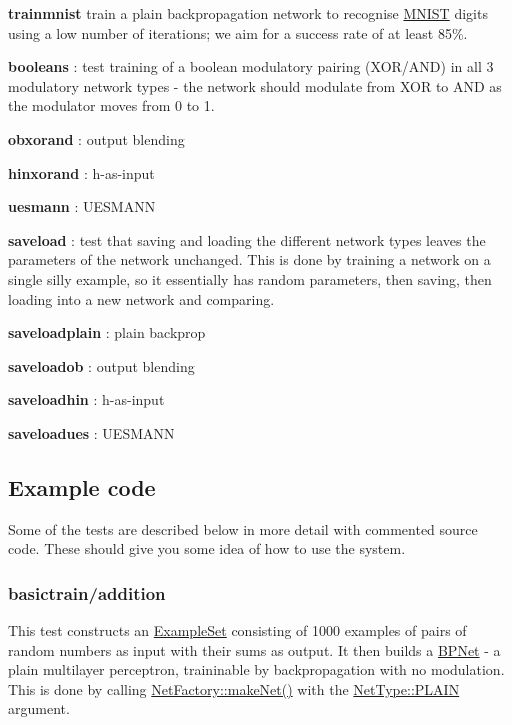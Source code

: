 \begin{DoxyItemize}
\begin{DoxyItemize}
\item {\bfseries trainmnist} train a plain backpropagation network to recognise \hyperlink{classMNIST}{M\+N\+I\+ST} digits using a low number of iterations; we aim for a success rate of at least 85\%.
\end{DoxyItemize}
\item {\bfseries booleans} \+: test training of a boolean modulatory pairing (X\+O\+R/\+A\+ND) in all 3 modulatory network types -\/ the network should modulate from X\+OR to A\+ND as the modulator moves from 0 to 1.
\begin{DoxyItemize}
\item {\bfseries obxorand} \+: output blending
\item {\bfseries hinxorand} \+: h-\/as-\/input
\item {\bfseries uesmann} \+: U\+E\+S\+M\+A\+NN
\end{DoxyItemize}
\item {\bfseries saveload} \+: test that saving and loading the different network types leaves the parameters of the network unchanged. This is done by training a network on a single silly example, so it essentially has random parameters, then saving, then loading into a new network and comparing.
\begin{DoxyItemize}
\item {\bfseries saveloadplain} \+: plain backprop
\item {\bfseries saveloadob} \+: output blending
\item {\bfseries saveloadhin} \+: h-\/as-\/input
\item {\bfseries saveloadues} \+: U\+E\+S\+M\+A\+NN
\end{DoxyItemize}
\end{DoxyItemize}

\subsection*{Example code}

Some of the tests are described below in more detail with commented source code. These should give you some idea of how to use the system.

\subsubsection*{basictrain/addition}

This test constructs an \hyperlink{classExampleSet}{Example\+Set} consisting of 1000 examples of pairs of random numbers as input with their sums as output. It then builds a \hyperlink{classBPNet}{B\+P\+Net} -\/ a plain multilayer perceptron, traininable by backpropagation with no modulation. This is done by calling \hyperlink{classNetFactory_abee207e81a04a7abf08e1f50bc2fe000}{Net\+Factory\+::make\+Net()} with the \hyperlink{netType_8hpp_a1526df0fc932ccf720aa26267f923213af62eb0bf5e5c72e80983fbbac1cb70e5}{Net\+Type\+::\+P\+L\+A\+IN} argument.

